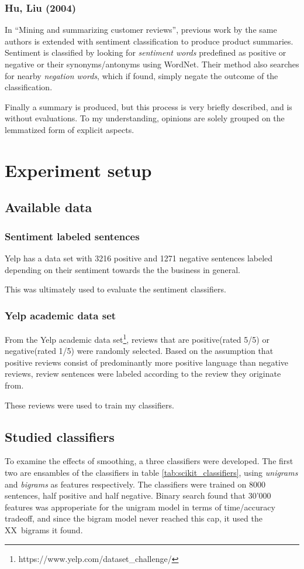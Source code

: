 \documentclass[a4paper,11pt]{kth-mag}
\newcommand{\numBigramFeatures}{XX}
\begin{document}
\subsubsection{Hu, Liu (2004)}
In ``Mining and summarizing customer reviews'', previous work by the same authors is extended with sentiment classification to produce product summaries. Sentiment is classified by looking for \emph{sentiment words} predefined as positive or negative or their synonyms/antonyms using WordNet. Their method also searches for nearby \emph{negation words}, which if found, simply negate the outcome of the classification.

Finally a summary is produced, but this process is very briefly described, and is without evaluations. To my understanding, opinions are solely grouped on the lemmatized form of explicit aspects.


\pagebreak
\section{Experiment setup}

\subsection{Available data}
\subsubsection{Sentiment labeled sentences}
Yelp has a data set with 3216 positive and 1271 negative sentences labeled depending on their sentiment towards the the business in general.

This was ultimately used to evaluate the sentiment classifiers.


\subsubsection{Yelp academic data set}
From the Yelp academic data set\footnote{https://www.yelp.com/dataset\_challenge/}, reviews that are positive(rated 5/5) or negative(rated 1/5) were randomly selected. Based on the assumption that positive reviews consist of predominantly more positive language than negative reviews, review sentences were labeled according to the review they originate from.

These reviews were used to train my classifiers.

\subsection{Studied classifiers}
To examine the effects of smoothing, a three classifiers were developed. The first two are ensambles of the classifiers in table \ref{tab:scikit_classifiers}, using \emph{unigrams} and \emph{bigrams} as features respectively. The classifiers were trained on 8000 sentences, half positive and half negative. Binary search found that 30'000 features was approperiate for the unigram model in terms of time/accuracy tradeoff, and since the bigram model never reached this cap, it used the \numBigramFeatures~bigrams it found.
\end{document}

